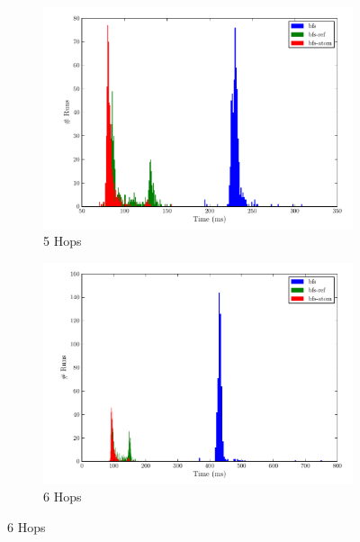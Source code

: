 				\begin{figure}[H]
					\ContinuedFloat
					\begin{subfigure}[b]{.5\linewidth}
						\includegraphics[scale=0.45]{figures/charts/5_hops.pdf}
						\caption{5 Hops}
						\label{subfig:5-hops}
					\end{subfigure}
					\begin{subfigure}[b]{.5\linewidth}
						\includegraphics[scale=0.45]{figures/charts/6_hops.pdf}
						\caption{6 Hops}
						\label{subfig:6-hops}
					\end{subfigure}
				\end{figure}
